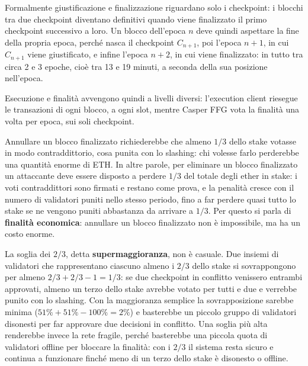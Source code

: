 \documentclass[a4paper, 11pt, oneside]{book}
\begin{document}
	Formalmente giustificazione e finalizzazione riguardano solo i checkpoint: i blocchi
	tra due checkpoint diventano definitivi quando viene finalizzato il primo checkpoint
	successivo a loro. Un blocco dell'epoca $n$ deve quindi aspettare la fine della
	propria epoca, perché nasca il checkpoint $C_{n+1}$, poi l'epoca $n+1$, in cui
	$C_{n+1}$ viene giustificato, e infine l'epoca $n+2$, in cui viene finalizzato: in
	tutto tra circa 2 e 3 epoche, cioè tra 13 e 19 minuti, a seconda della sua posizione
	nell'epoca.

	Esecuzione e finalità avvengono quindi a livelli diversi: l'execution client
	riesegue le transazioni di ogni blocco, a ogni slot, mentre Casper FFG vota la
	finalità una volta per epoca, sui soli checkpoint.

	Annullare un blocco finalizzato richiederebbe che almeno $1/3$ dello stake votasse
	in modo contraddittorio, cosa punita con lo slashing: chi volesse farlo perderebbe
	una quantità enorme di ETH. In altre parole, per eliminare un blocco finalizzato un
	attaccante deve essere disposto a perdere $1/3$ del totale degli ether in stake: i
	voti contraddittori sono firmati e restano come prova, e la penalità cresce con il
	numero di validatori puniti nello stesso periodo, fino a far perdere quasi tutto lo
	stake se ne vengono puniti abbastanza da arrivare a $1/3$. Per questo si parla di
	\textbf{finalità economica}: annullare un blocco finalizzato non è impossibile, ma ha
	un costo enorme.

	La soglia dei $2/3$, detta \textbf{supermaggioranza}, non è casuale. Due insiemi di
	validatori che rappresentano ciascuno almeno i $2/3$ dello stake si sovrappongono per
	almeno $2/3 + 2/3 - 1 = 1/3$: se due checkpoint in conflitto venissero entrambi
	approvati, almeno un terzo dello stake avrebbe votato per tutti e due e verrebbe
	punito con lo slashing. Con la maggioranza semplice la sovrapposizione sarebbe minima
	($51\% + 51\% - 100\% = 2\%$) e basterebbe un piccolo gruppo di validatori disonesti
	per far approvare due decisioni in conflitto. Una soglia più alta renderebbe invece
	la rete fragile, perché basterebbe una piccola quota di validatori offline per
	bloccare la finalità: con i $2/3$ il sistema resta sicuro e continua a funzionare
	finché meno di un terzo dello stake è disonesto o offline.
\end{document}
